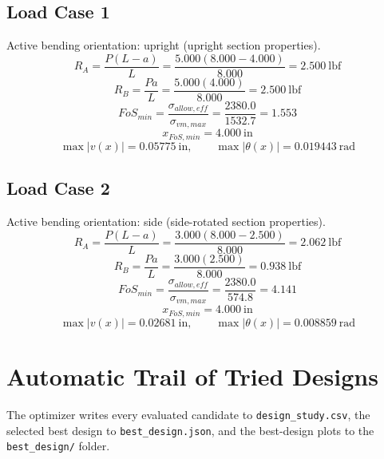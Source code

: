 \documentclass[11pt]{article}
\begin{document}
\subsection*{Load Case 1}
Active bending orientation: upright (upright section properties).
\[R_A = \frac{P(L-a)}{L} = \frac{5.000(8.000-4.000)}{8.000} = 2.500\ \mathrm{lbf}\]
\[R_B = \frac{Pa}{L} = \frac{5.000(4.000)}{8.000} = 2.500\ \mathrm{lbf}\]
\[FoS_{min} = \frac{\sigma_{allow,eff}}{\sigma_{vm,max}} = \frac{2380.0}{1532.7} = 1.553\]
\[x_{FoS,min} = 4.000\ \mathrm{in}\]
\[\max |v(x)| = 0.05775\ \mathrm{in}, \qquad \max |\theta(x)| = 0.019443\ \mathrm{rad}\]
\subsection*{Load Case 2}
Active bending orientation: side (side-rotated section properties).
\[R_A = \frac{P(L-a)}{L} = \frac{3.000(8.000-2.500)}{8.000} = 2.062\ \mathrm{lbf}\]
\[R_B = \frac{Pa}{L} = \frac{3.000(2.500)}{8.000} = 0.938\ \mathrm{lbf}\]
\[FoS_{min} = \frac{\sigma_{allow,eff}}{\sigma_{vm,max}} = \frac{2380.0}{574.8} = 4.141\]
\[x_{FoS,min} = 4.000\ \mathrm{in}\]
\[\max |v(x)| = 0.02681\ \mathrm{in}, \qquad \max |\theta(x)| = 0.008859\ \mathrm{rad}\]

\section*{Automatic Trail of Tried Designs}
The optimizer writes every evaluated candidate to \texttt{design\_study.csv}, the selected best design to \texttt{best\_design.json}, and the best-design plots to the \texttt{best\_design/} folder.
\end{document}
